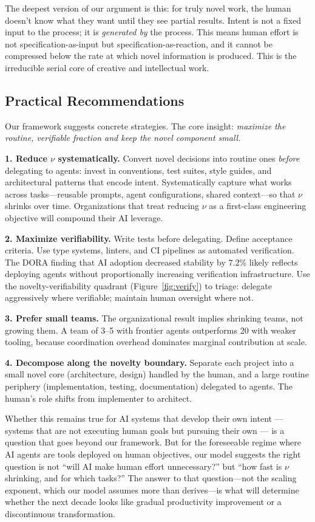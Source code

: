 \documentclass[11pt,a4paper]{article}
\begin{document}
The deepest version of our argument is this: for truly novel work, the human doesn't know what they want until they see partial results. Intent is not a fixed input to the process; it is \emph{generated by} the process. This means human effort is not specification-as-input but specification-as-reaction, and it cannot be compressed below the rate at which novel information is produced. This is the irreducible serial core of creative and intellectual work.

\subsection{Practical Recommendations}

Our framework suggests concrete strategies. The core insight: \emph{maximize the routine, verifiable fraction and keep the novel component small.}

\textbf{1. Reduce $\nu$ systematically.} Convert novel decisions into routine ones \emph{before} delegating to agents: invest in conventions, test suites, style guides, and architectural patterns that encode intent. Systematically capture what works across tasks---reusable prompts, agent configurations, shared context---so that $\nu$ shrinks over time. Organizations that treat reducing $\nu$ as a first-class engineering objective will compound their AI leverage.

\textbf{2. Maximize verifiability.} Write tests before delegating. Define acceptance criteria. Use type systems, linters, and CI pipelines as automated verification. The DORA finding that AI adoption decreased stability by 7.2\% \citep{dora2024} likely reflects deploying agents without proportionally increasing verification infrastructure. Use the novelty-verifiability quadrant (Figure~\ref{fig:verify}) to triage: delegate aggressively where verifiable; maintain human oversight where not.

\textbf{3. Prefer small teams.} The organizational result implies shrinking teams, not growing them. A team of 3--5 with frontier agents outperforms 20 with weaker tooling, because coordination overhead dominates marginal contribution at scale.

\textbf{4. Decompose along the novelty boundary.} Separate each project into a small novel core (architecture, design) handled by the human, and a large routine periphery (implementation, testing, documentation) delegated to agents. The human's role shifts from implementer to architect.

Whether this remains true for AI systems that develop their own intent --- systems that are not executing human goals but pursuing their own --- is a question that goes beyond our framework. But for the foreseeable regime where AI agents are tools deployed on human objectives, our model suggests the right question is not ``will AI make human effort unnecessary?'' but ``how fast is $\nu$ shrinking, and for which tasks?'' The answer to that question---not the scaling exponent, which our model assumes more than derives---is what will determine whether the next decade looks like gradual productivity improvement or a discontinuous transformation.
\end{document}
